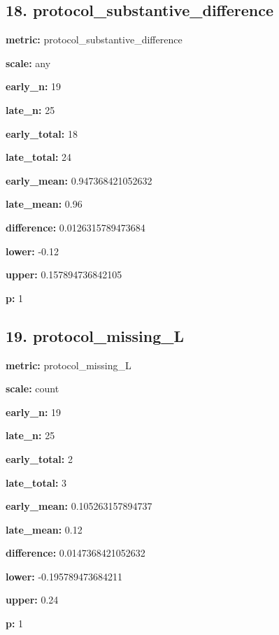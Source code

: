 \documentclass[10pt,a4paper]{article}
\begin{document}
\subsection*{18.\allowbreak{} protocol\_\allowbreak{}substantive\_\allowbreak{}difference}
\textbf{metric:} protocol\_\allowbreak{}substantive\_\allowbreak{}difference\par
\textbf{scale:} any\par
\textbf{early\_\allowbreak{}n:} 19\par
\textbf{late\_\allowbreak{}n:} 25\par
\textbf{early\_\allowbreak{}total:} 18\par
\textbf{late\_\allowbreak{}total:} 24\par
\textbf{early\_\allowbreak{}mean:} 0.\allowbreak{}947368421052632\par
\textbf{late\_\allowbreak{}mean:} 0.\allowbreak{}96\par
\textbf{difference:} 0.\allowbreak{}0126315789473684\par
\textbf{lower:} -\allowbreak{}0.\allowbreak{}12\par
\textbf{upper:} 0.\allowbreak{}157894736842105\par
\textbf{p:} 1\par
\subsection*{19.\allowbreak{} protocol\_\allowbreak{}missing\_\allowbreak{}L}
\textbf{metric:} protocol\_\allowbreak{}missing\_\allowbreak{}L\par
\textbf{scale:} count\par
\textbf{early\_\allowbreak{}n:} 19\par
\textbf{late\_\allowbreak{}n:} 25\par
\textbf{early\_\allowbreak{}total:} 2\par
\textbf{late\_\allowbreak{}total:} 3\par
\textbf{early\_\allowbreak{}mean:} 0.\allowbreak{}105263157894737\par
\textbf{late\_\allowbreak{}mean:} 0.\allowbreak{}12\par
\textbf{difference:} 0.\allowbreak{}0147368421052632\par
\textbf{lower:} -\allowbreak{}0.\allowbreak{}195789473684211\par
\textbf{upper:} 0.\allowbreak{}24\par
\textbf{p:} 1\par
\end{document}
